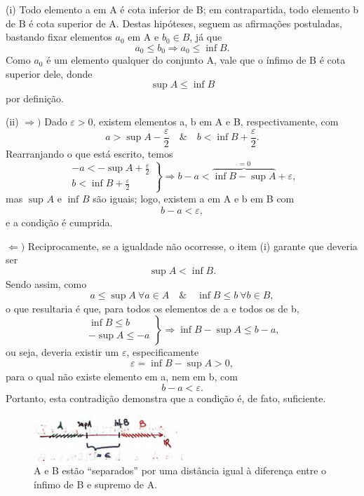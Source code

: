 \documentclass[../analysisII_notes.tex]{subfiles}
\begin{document}
\begin{proof*}
	(i) Todo elemento a em A é cota inferior de B; em contrapartida, todo elemento b de B é cota superior de A. Destas hipóteses, seguem as afirmações postuladas, bastando fixar elementos \(a_{0}\) em A e \(b_{0}\in B\), já que
	\[
		a_{0}\leq b_{0} \Rightarrow a_{0}\leq \inf_{}B.
	\]
	Como \(a_{0}\) é um elemento qualquer do conjunto A, vale que o ínfimo de B é cota superior dele, donde
	\[
		\sup_{}A\leq \inf_{}B
	\]
	por definição.

	(ii) \(\Rightarrow )\) Dado \(\varepsilon > 0\), existem elementos a, b em A e B, respectivamente, com
	\[
		a>\sup_{}A-\frac{\varepsilon }{2}\quad\&\quad b<\inf_{}B + \frac{\varepsilon }{2}.
	\]
	Rearranjando o que está escrito, temos
	\[
		\left.\begin{array}{ll}
			-a < -\sup_{}A +\frac{\varepsilon }{2} \\
			b < \inf_{}B + \frac{\varepsilon }{2}
		\end{array}\right\} \Rightarrow b-a < \overbrace{\inf_{}B-\sup_{}A}^{=0}+\varepsilon,
	\]
	mas \(\sup_{}A\) e \(\inf_{}B\) são iguais; logo, existem a em A e b em B com
	\[
		b-a < \varepsilon ,
	\]
	e a condição é cumprida.

	\(\Leftarrow )\) Reciprocamente, se a igualdade não ocorresse, o item (i) garante que deveria ser
	\[
		\sup_{}A<\inf_{}B.
	\]
	Sendo assim, como
	\[
		a\leq \sup_{}A\: \forall a\in A \quad\&\quad \inf_{}B\leq b\: \forall b\in B,
	\]
	o que resultaria é que, para todos os elementos de a e todos os de b,
	\[
		\left.\begin{array}{ll}
			\inf_{}B\leq b \\
			-\sup_{}A\leq -a
		\end{array}\right\} \Rightarrow \inf_{}B-\sup_{}A \leq b-a,
	\]
	ou seja, deveria existir um \(\varepsilon \), especificamente
	\[
		\varepsilon =\inf_{}B-\sup_{}A > 0,
	\]
	para o qual não existe elemento em a, nem em b, com
	\[
		b-a <\varepsilon.
	\]
	Portanto, esta contradição demonstra que a condição é, de fato, suficiente. \qedsymbol
	\begin{figure}[H]
		\begin{center}
			\includegraphics[height=0.5\textheight, width=0.5\textwidth, keepaspectratio]{./Images/sup_inf_07.png}
		\end{center}
		\caption{A e B estão ``separados'' por uma distância igual à diferença entre o ínfimo de B e supremo de A.}
		\label{supinf07}
	\end{figure}
\end{proof*}
\end{document}
